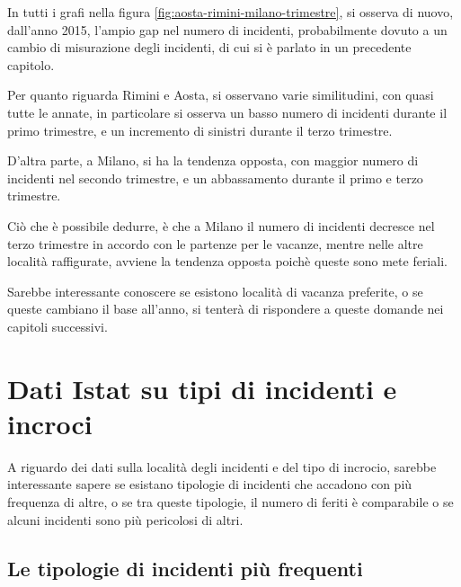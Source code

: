\documentclass[a4paper]{report}
\begin{document}
In tutti i grafi nella figura \ref{fig:aosta-rimini-milano-trimestre}, si osserva di nuovo, 
dall'anno 2015, l'ampio gap nel numero di incidenti, probabilmente dovuto a un cambio di 
misurazione degli incidenti, di cui si è parlato in un precedente capitolo. 

Per quanto riguarda Rimini e Aosta, si osservano varie similitudini, con quasi tutte le annate, 
in particolare si osserva un basso numero di incidenti durante il primo trimestre, e un incremento di 
sinistri durante il terzo trimestre.

D'altra parte, a Milano, si ha la tendenza opposta, con maggior numero di incidenti nel secondo trimestre, 
e un abbassamento durante il primo e terzo trimestre.

Ciò che è possibile dedurre, è che a Milano il numero di incidenti decresce nel terzo trimestre in 
accordo con le partenze per le vacanze, mentre nelle altre località raffigurate, avviene la tendenza 
opposta poichè queste sono mete feriali.

Sarebbe interessante conoscere se esistono località di vacanza preferite, o se queste cambiano il base 
all'anno, si tenterà di rispondere a queste domande nei capitoli successivi.

\section{Dati Istat su tipi di incidenti e incroci}

A riguardo dei dati sulla località degli incidenti e del tipo di incrocio, sarebbe interessante 
sapere se esistano tipologie di incidenti che accadono con più frequenza di altre, o 
se tra queste tipologie, il numero di feriti è comparabile o se alcuni incidenti sono più 
pericolosi di altri.

\subsection{Le tipologie di incidenti più frequenti}
\end{document}
